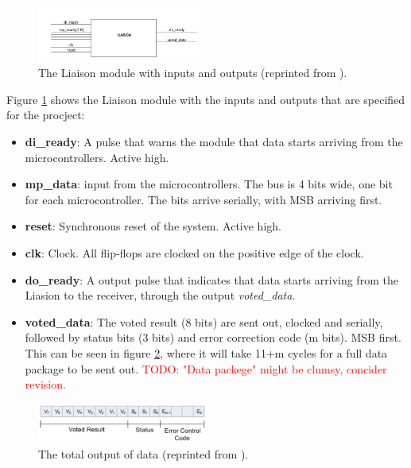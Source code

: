 \documentclass[a4paper]{IEEEtran}
\newcommand\TODO[1]{\textcolor{red}{TODO:#1}}
\newcommand\todo[1]{\TODO{#1}}
\begin{document}
\begin{figure}[h!]
    \centering
    \includegraphics[width=0.5\textwidth]{Figures/ProjectDescription/LiaisonBlackBox}
    \caption{The Liaison module with inputs and outputs (reprinted from \protect\cite{assignment-text}).}
    \label{fig:LiaisonBlackBox}
\end{figure}

Figure \ref{fig:LiaisonBlackBox} shows the Liaison module with the inputs and outputs that are specified for the procject:
\begin{itemize}
    \item \textbf{di\_ready}: A pulse that warns the module that data starts arriving from the microcontrollers. Active high.
    \item \textbf{mp\_data}: input from the microcontrollers. The bus is 4 bits wide, one bit for each microcontroller. The bits arrive serially, with MSB arriving first.
    \item \textbf{reset}: Synchronous reset of the system. Active high.
    \item \textbf{clk}: Clock. All flip-flops are clocked on the positive edge of the clock.
    \item \textbf{do\_ready}: A output pulse that indicates that data starts arriving from the Liasion to the receiver, through the output \textit{voted\_data}.
    \item  \textbf{voted\_data}: The voted result (8 bits) are sent out, clocked and serially, followed by status bits (3 bits) and error correction code (m bits).
        MSB first.
        This can be seen in figure \ref{fig:LiaisonOutput}, where it will take 11+m cycles for a full data package to be sent out. \todo{ "Data packege" might be clumsy, concider revision.}
\end{itemize}

\begin{figure}[h!]
    \centering
    \includegraphics[width=0.5\textwidth]{Figures/ProjectDescription/LiaisonOutput}
    \caption{The total output of data (reprinted from \protect\cite{assignment-text}).}
    \label{fig:LiaisonOutput}
\end{figure}
\end{document}
